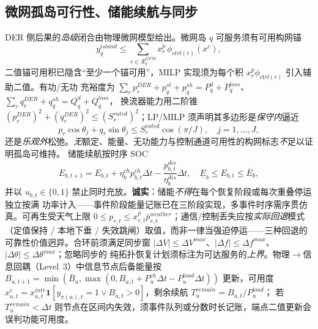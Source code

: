 \subsection{微网孤岛可行性、储能续航与同步}\label{sec:rel-pf-microgrid}
DER 侧后果的\emph{岛级}闭合由物理微网模型给出。微网岛 $q$ 可服务须有可用构网锚
\begin{equation}
 y_q^{island}\le\sum_{r\in\mathcal R_q^{GFM}}x_r^p\,\phi_{ctrl(r)}(x^c),
\end{equation}
二值锚可用积已隐含“至少一个锚可用”，MILP 实现须为每个积 $x_r^p\phi_{ctrl(r)}$ 引入辅助二值。有功/无功
充裕度为 $\sum_{r}p_r^{DER}+p_q^{st}+p_q^{sh}=P_q^d+P_q^{loss}$、$\sum_{r}q_r^{DER}+q_q^{sh}=Q_q^d+Q_q^{loss}$，
换流器能力用二阶锥 $(p_r^{DER})^2+(q_r^{DER})^2\le(S_r^{rated})^2$；LP/MILP 须声明其多边形是\emph{保守内}逼近
\begin{equation}
 p_r\cos\theta_j+q_r\sin\theta_j\le S_r^{rated}\cos(\pi/J),\quad j=1,\dots,J,
\end{equation}
还是\emph{乐观外}松弛。\emph{无}额定、能量、无功能力与控制通道可用性的构网标志\emph{不}足以证明孤岛可维持。
储能续航按时序 SOC
\begin{equation}
 E_{b,t+1}=E_{b,t}+\eta_b^{ch}p_{b,t}^{ch}\Delta t-\frac{p_{b,t}^{dis}}{\eta_b^{dis}}\Delta t,\quad
 \underline E_b\le E_{b,t}\le\overline E_b,
\end{equation}
并以 $u_{b,t}\in\{0,1\}$ 禁止同时充放。\textbf{诚实}：储能\emph{不得}在每个恢复阶段或每次重叠停运独立按满
功率计入——事件阶段能量记账已在三阶段实现，多事件时序需序贯仿真。可再生受天气上限
$0\le p_{r,t}\le x_{r,t}^p\bar p_{r,t}^{weather}$；通信/控制丢失应按\emph{实际回退}模式（定值保持 /
本地下垂 / 失效跳闸）取值，而非一律当强迫停运——三种回退的可靠性价值迥异。合环前须满足同步窗
$|\Delta V|\le\Delta V^{max}$、$|\Delta f|\le\Delta f^{max}$、$|\Delta\theta|\le\Delta\theta^{max}$；忽略同步的
纯拓扑恢复计划须标注为可达服务的\emph{上界}。物理$\to$信息回耦（Level~3）中信息节点后备能量按
$B_{u,t+1}=\min(\overline B_u,\max(0,B_{u,t}+P_u^{ch}\Delta t-P_u^{load}\Delta t))$ 更新，可用度
$x_{u,t}^c=x_{u,t}^{intr}\mathbf 1[y_{\pi(u),t}{=}1\lor B_{u,t}{>}0]$，剩余续航 $T_u^{remain}=B_{u,t}/P_u^{load}$；
若 $T_u^{remain}<\Delta t$ 则节点在区间内失效，须事件队列或分数时长记账，端点二值更新会误判功能可用度。

